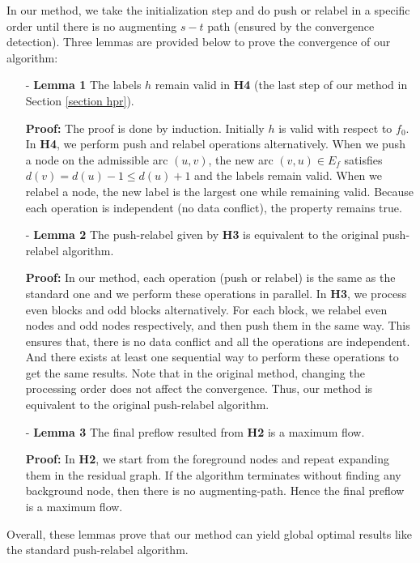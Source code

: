 In our method, we take the initialization step and do push or relabel in a specific order until there is no augmenting $s-t$ path (ensured by the convergence detection).
Three lemmas are provided below to prove the convergence of our algorithm:

\begin{itemize}
\item[-] \textbf{Lemma 1} The labels $h$ remain valid in \textbf{H4} (the last step of our method in Section \ref{section hpr}).
\item[] \textbf{Proof:}
The proof is done by induction.
Initially $h$ is valid with respect to $f_0$.
In \textbf{H4}, we perform push and relabel operations alternatively.
When we push a node on the admissible arc $(u, v)$, the new arc $(v, u) \in E_f$ satisfies $d(v) = d(u) - 1 \le d(u) + 1$ and the labels remain valid.
When we relabel a node, the new label is the largest one while remaining valid.
Because each operation is independent (no data conflict), the property remains true.

\item[-] \textbf{Lemma 2} The push-relabel given by \textbf{H3} is equivalent to the original push-relabel algorithm.
\item[] \textbf{Proof:}
In our method, each operation (push or relabel) is the same as the standard one and we perform these operations in parallel.
In \textbf{H3}, we process even blocks and odd blocks alternatively.
For each block, we relabel even nodes and odd nodes respectively, and then push them in the same way.
This ensures that, there is no data conflict and all the operations are independent.
And there exists at least one sequential way to perform these operations to get the same results.
Note that in the original method, changing the processing order does not affect the convergence.
Thus, our method is equivalent to the original push-relabel algorithm.

\item[-] \textbf{Lemma 3} The final preflow resulted from \textbf{H2} is a maximum flow.
\item[] \textbf{Proof:}
In \textbf{H2}, we start from the foreground nodes and repeat expanding them in the residual graph.
If the algorithm terminates without finding any background node, then there is no augmenting-path.
Hence the final preflow is a maximum flow.
\end{itemize}

Overall, these lemmas prove that our method can yield global optimal results like the standard push-relabel algorithm.

